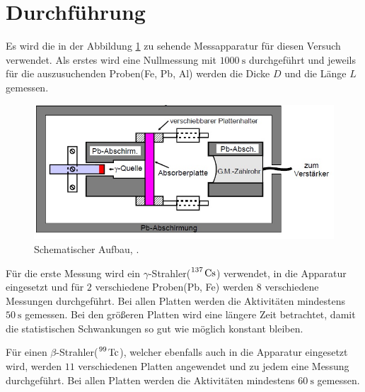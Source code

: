 \section{Durchführung}
\label{sec:Durchführung}
Es wird die in der Abbildung \ref{fig:versuchsaufbau} zu sehende Messapparatur für diesen Versuch verwendet. Als erstes wird eine Nullmessung mit $\SI{1000}{\second}$ durchgeführt und jeweils für die auszusuchenden Proben(Fe, Pb, Al) werden die Dicke $D$ und die Länge $L$ gemessen. 

\begin{figure}[h!]
	\centering
	\includegraphics[width=0.7\linewidth]{Versuchsaufbau.jpg}
	\caption{Schematischer Aufbau, \cite[14]{anleitung704}.}
	\label{fig:versuchsaufbau}
\end{figure}

Für die erste Messung wird ein $\gamma$-Strahler($\ce{^137 Cs}$) verwendet, in die Apparatur eingesetzt und für $2$ verschiedene Proben(Pb, Fe) werden $8$ verschiedene Messungen durchgeführt. Bei allen Platten werden die Aktivitäten mindestens $\SI{50}{\second}$ gemessen. Bei den größeren Platten wird eine längere Zeit betrachtet, damit die statistischen Schwankungen so gut wie möglich konstant bleiben. 

Für einen $\beta$-Strahler($\ce{^99 Tc}$), welcher ebenfalls auch in die Apparatur eingesetzt wird, werden $11$ verschiedenen Platten angewendet und zu jedem eine Messung durchgeführt. Bei allen Platten werden die Aktivitäten mindestens $\SI{60}{\second}$ gemessen. 